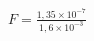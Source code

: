 \documentclass[preview,border=1pt,12pt]{standalone}
\begin{document}
$\displaystyle F = \frac{1{,}35 \times 10^{-7}}{1{,}6 \times 10^{-3}}$
\end{document}
